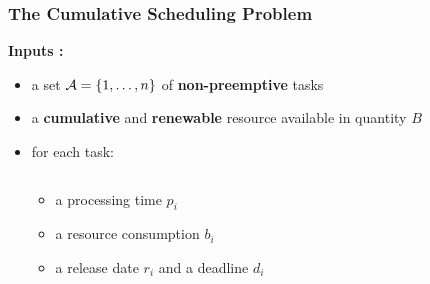 \begin{frame}
  \frametitle{The Cumulative Scheduling Problem} 
  \vspace{0.1cm}
  \textbf{Inputs : }
  \vspace{0.15cm}
  \begin{itemize}
  \item a set ${\cal A}=\{1,\dots ,n\}$ of {\bf non-preemptive} tasks
    \vspace{0.15cm}
  \item a {\bf cumulative} and {\bf renewable} resource available in quantity $B$
    \vspace{0.15cm}
  \item<2-> for each task:
    \vspace{-1cm}
    \begin{columns}
      \hfill
      \begin{column}{0.36\linewidth}
        \begin{itemize}
        \item<2-> \footnotesize  a processing time $p_i$
        \item<3-> \footnotesize a resource consumption $b_i$ 
        \item<4-> \footnotesize a release date $r_i$ and a deadline $d_i$ 
        \end{itemize}
      \end{column}
      \begin{column}{0.7\linewidth}
        \centering
        
      \end{column} 
    \end{columns}
  \end{itemize}
  \vspace{-0.5cm}
\end{frame}

